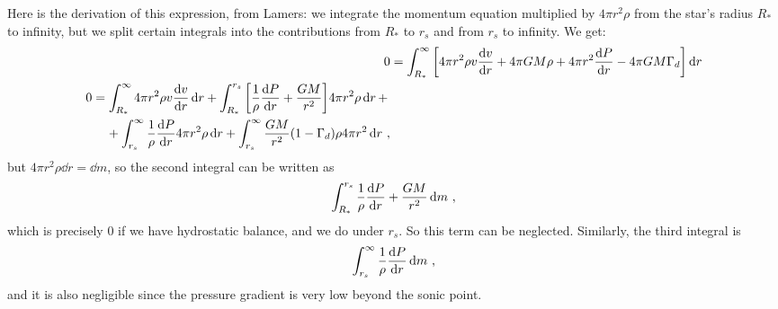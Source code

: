 \documentclass[main.tex]{subfiles}
\begin{document}
\begin{bluebox}
Here is the derivation of this expression, from Lamers:
we integrate the momentum equation multiplied by \(4 \pi r^2 \rho \) from the star's radius \(R_{*}\) to infinity, but we split certain integrals into the contributions from \(R_{*}\) to \(r_s\) and from \(r_s\) to infinity. We get: 
%
\begin{align}
0 &= \int_{R_*}^{ \infty } \qty[ 4 \pi r^2 \rho  v \dv{v}{r} + 4 \pi GM \rho    
+ 4 \pi r^2 \dv{P}{r} - 4 \pi GM \Gamma_{d}] \dd{r}  \\
\begin{split}
0 &= \int_{R_*}^{ \infty } 4 \pi r^2 \rho  v \dv{v}{r} \dd{r}
+ \int_{R_*}^{r_s}  \qty[\frac{1}{\rho } \dv{P}{r} + \frac{GM}{r^2} ] 4 \pi r^2 \rho \dd{r} + \\
&\phantom{=}\ 
+ \int_{r_s}^{ \infty } \frac{1}{\rho } \dv{P}{r} 4 \pi r^2 \rho \dd{r} 
+ \int_{r_s}^{ \infty } \frac{GM}{r^2} (1 - \Gamma_{d})
\rho 4 \pi r^2 \dd{r} 
\,,
\end{split}
\end{align}
%
but \(4 \pi r^2 \rho \dd{r} = \dd{m}\), so the second integral can be written as 
%
\begin{align}
\int_{R_*}^{r_s} \frac{1}{\rho } \dv{P}{r}  + \frac{GM}{r^2}
 \dd{m}
\,,
\end{align}
%
which is precisely 0 if we have hydrostatic balance, and we do under \(r_s\). So this term can be neglected. 
Similarly, the third integral is 
%
\begin{align}
\int_{r_s}^{ \infty } \frac{1}{\rho } \dv{P}{r} \dd{m}
\,,
\end{align}
%
and it is also negligible since the pressure gradient is very low beyond the sonic point.


\end{bluebox}
\end{document}
